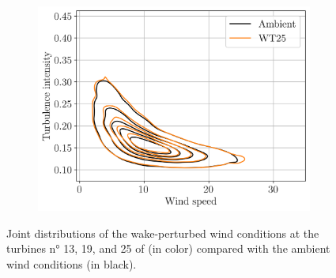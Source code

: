 \begin{figure}
\begin{subfigure}[b]{0.48\textwidth}
        \includegraphics[width=\textwidth]{part2/figures/WAKE/joint_perturbation_SB_WT25.png}
    \end{subfigure}
    \caption{Joint distributions of the wake-perturbed wind conditions at the turbines n° 13, 19, and 25 of  (in color) compared with the ambient wind conditions (in black).}
    \label{fig:FIGJointPerturbationSB}
\end{figure}

